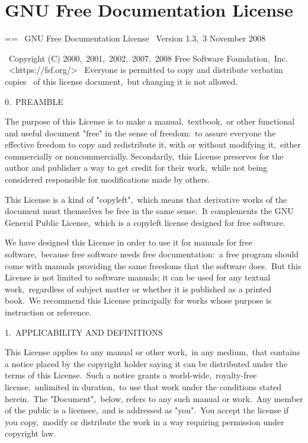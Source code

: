 \documentclass{book}
\makeatletter
\newenvironment{Texinfopreformatted}{%
  \par\GNUTobeylines\obeyspaces\frenchspacing\parskip=\z@\parindent=\z@}{}
{\catcode`\^^M=13 \gdef\GNUTobeylines{\catcode`\^^M=13 \def^^M{\null\par}}}
\newenvironment{Texinfoindented}{\begin{list}{}{}\item\relax}{\end{list}}
\renewcommand{\_}{\Texinfounderscore\discretionary{}{}{}}
\makeatother
\begin{document}
\appendix
\chapter{{GNU Free Documentation License}}
\label{anchor:GNU-Free-Documentation-License}%

\begin{Texinfoindented}
\begin{Texinfopreformatted}%
\ttfamily 
\                GNU Free Documentation License
\                 Version 1.3,\ 3 November 2008


\ Copyright (C) 2000,\ 2001,\ 2002,\ 2007,\ 2008 Free Software Foundation,\ Inc.
\     <https://fsf.org/>
\ Everyone is permitted to copy and distribute verbatim copies
\ of this license document,\ but changing it is not allowed.

0.\ PREAMBLE

The purpose of this License is to make a manual,\ textbook,\ or other
functional and useful document "free" in the sense of freedom:\ to
assure everyone the effective freedom to copy and redistribute it,
with or without modifying it,\ either commercially or noncommercially.
Secondarily,\ this License preserves for the author and publisher a way
to get credit for their work,\ while not being considered responsible
for modifications made by others.

This License is a kind of "copyleft",\ which means that derivative
works of the document must themselves be free in the same sense.\  It
complements the GNU General Public License,\ which is a copyleft
license designed for free software.

We have designed this License in order to use it for manuals for free
software,\ because free software needs free documentation:\ a free
program should come with manuals providing the same freedoms that the
software does.\  But this License is not limited to software manuals;
it can be used for any textual work,\ regardless of subject matter or
whether it is published as a printed book.\  We recommend this License
principally for works whose purpose is instruction or reference.


1.\ APPLICABILITY AND DEFINITIONS

This License applies to any manual or other work,\ in any medium,\ that
contains a notice placed by the copyright holder saying it can be
distributed under the terms of this License.\  Such a notice grants a
world-wide,\ royalty-free license,\ unlimited in duration,\ to use that
work under the conditions stated herein.\  The "Document",\ below,
refers to any such manual or work.\  Any member of the public is a
licensee,\ and is addressed as "you".\  You accept the license if you
copy,\ modify or distribute the work in a way requiring permission
under copyright law.


\end{Texinfopreformatted}
\end{Texinfoindented}
\end{document}
